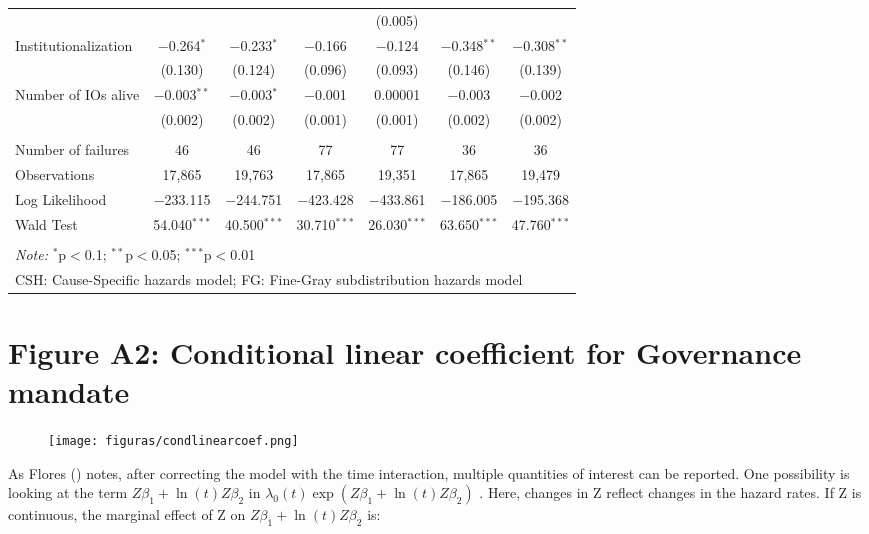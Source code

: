 \documentclass[12pt]{article}
\begin{document}
\begin{table}[H]
\begin{tabular}{@{\extracolsep{5pt}}lcccccc}
 &  &  &  & (0.005) &  & \\ 
Institutionalization & $-$0.264$^{*}$ & $-$0.233$^{*}$ & $-$0.166 & $-$0.124 & $-$0.348$^{**}$ & $-$0.308$^{**}$ \\ 
 & (0.130) & (0.124) & (0.096) & (0.093) & (0.146) & (0.139) \\ 
Number of IOs alive & $-$0.003$^{**}$ & $-$0.003$^{*}$ & $-$0.001 & 0.00001 & $-$0.003 & $-$0.002 \\ 
 & (0.002) & (0.002) & (0.001) & (0.001) & (0.002) & (0.002) \\ 
\hline \\[-1.8ex] 
Number of failures & 46 & 46 & 77 & 77 & 36 & 36 \\ 
Observations & 17,865 & 19,763 & 17,865 & 19,351 & 17,865 & 19,479 \\ 
Log Likelihood & $-$233.115 & $-$244.751 & $-$423.428 & $-$433.861 & $-$186.005 & $-$195.368 \\ 
Wald Test & 54.040$^{***}$ & 40.500$^{***}$ & 30.710$^{***}$ & 26.030$^{***}$ & 63.650$^{***}$ & 47.760$^{***}$ \\ 
\hline 
\hline \\[-1.8ex] 
\multicolumn{7}{l}{\textit{Note:} $^{*}$p$<$0.1; $^{**}$p$<$0.05; $^{***}$p$<$0.01} \\ 
\multicolumn{7}{l}{CSH: Cause-Specific hazards model; FG: Fine-Gray subdistribution hazards model} \\ 
\end{tabular} 
\end{table}

\newpage
\section*{Figure A2: Conditional linear coefficient for Governance mandate}

\begin{figure}[H]
  \centering
  \texttt{[image: figuras/condlinearcoef.png]}
  \label{fig:condlinearcoef}
\end{figure}

As Flores (\citeyear{flores2022survival}) notes, after correcting the model with the time interaction, multiple quantities of interest can be reported. One possibility is looking at the term $Z\beta_1 + \ln(t)Z\beta_2$ in $\lambda_0(t) \exp\left(Z\beta_1 + \ln(t)Z\beta_2\right)$ . Here, changes in Z reflect changes in the hazard rates. If Z is continuous, the marginal effect of Z on $Z\beta_1 + \ln(t)Z\beta_2$ is: 
\end{document}
